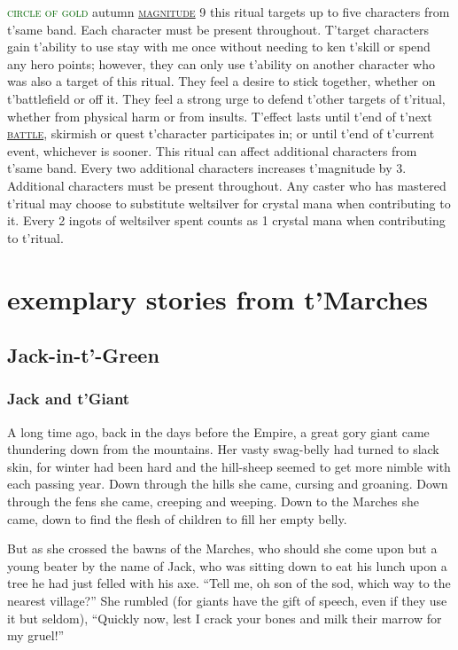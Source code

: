 \documentclass[twoside,11pt,b5paper,twocolumn]{scrbook}
\newcommand{\estcab}[1]{\textsc{\textcolor{marron}{#1}}}
\newcommand{\keyword}[1]{\textcolor{darkgreen}{#1}}
\renewcommand{\paragraph}[1]{\par\noindent\markboth{#1}{#1}\estcab{\keyword{#1}}\label{#1} }
\newcommand{\see}[1]{{\estcab{\hyperref[#1]{#1}}}}
\begin{document}
\paragraph{circle of gold} autumn \see{magnitude} 9 this ritual targets up to five characters from t'same band. Each character must be present throughout. T'target characters gain t'ability to use stay with me once without needing to ken t'skill or spend any hero points; however, they can only use t'ability on another character who was also a target of this ritual. They feel a desire to stick together, whether on t'battlefield or off it. They feel a strong urge to defend t'other targets of t'ritual, whether from physical harm or from insults. T'effect lasts until t'end of t'next \see{battle}, skirmish or quest t'character participates in; or until t'end of t'current event, whichever is sooner. This ritual can affect additional characters from t'same band. Every two additional characters increases t'magnitude by 3. Additional characters must be present throughout. Any caster who has mastered t'ritual may choose to substitute weltsilver for crystal mana when contributing to it. Every 2 ingots of weltsilver spent counts as 1 crystal mana when contributing to t'ritual.

\chapter{exemplary stories from t'Marches}
\label{stories}
\section{Jack-in-t'-Green}
\subsection{Jack and t'Giant}
A long time ago, back in the days before the Empire, a great gory giant came thundering down from the mountains. Her vasty swag-belly had turned to slack skin, for winter had been hard and the hill-sheep seemed to get more nimble with each passing year. Down through the hills she came, cursing and groaning. Down through the fens she came, creeping and weeping. Down to the Marches she came, down to find the flesh of children to fill her empty belly.

But as she crossed the bawns of the Marches, who should she come upon but a young beater by the name of Jack, who was sitting down to eat his lunch upon a tree he had just felled with his axe. “Tell me, oh son of the sod, which way to the nearest village?” She rumbled (for giants have the gift of speech, even if they use it but seldom), “Quickly now, lest I crack your bones and milk their marrow for my gruel!”
\end{document}
